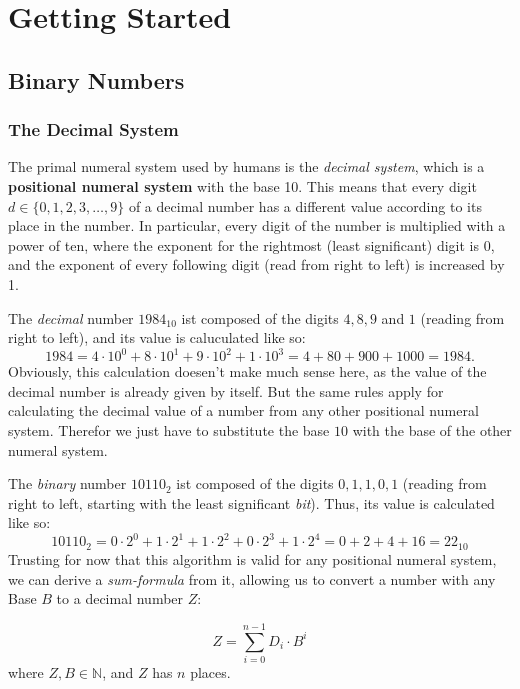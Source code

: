 \chapter{Getting Started}

\section{Binary Numbers}

\subsection{The Decimal System}

The primal numeral system used by humans is the \emph{decimal system}, which is a \textbf{positional numeral system} with the base 10.
This means that every digit $d \in \{0,1,2,3,\ldots,9\}$ of a decimal number has a different value according to its place in the number.
In particular, every digit of the number is multiplied with a power of ten, where the exponent for the rightmost (least significant) digit is 0, and the exponent of every following digit (read from right to left) is increased by 1.

The \emph{decimal} number $1984_{10}$ ist composed of the digits $4,8,9$ and $1$ (reading from right to left), and its value is caluculated like so:
\begin{equation*}
1984=4\cdot10^0+8\cdot10^1+9\cdot10^2+1\cdot10^3=4+80+900+1000=1984.
\end{equation*}
Obviously, this calculation doesen't make much sense here, as the value of the decimal number is already given by itself.
But the same rules apply for calculating the decimal value of a number from any other positional numeral system.
Therefor we just have to substitute the base $10$ with the base of the other numeral system.

The \emph{binary} number $10110_2$ ist composed of the digits $0,1,1,0,1$ (reading from right to left, starting with the least significant \emph{bit}). 
Thus, its value is calculated like so:
\begin{equation*}
10110_2=0\cdot2^0+1\cdot2^1+1\cdot2^2+0\cdot2^3+1\cdot2^4=0+2+4+16=22_{10}
\end{equation*}
Trusting for now that this algorithm is valid for any positional numeral system, we can derive a \emph{sum-formula} from it, allowing us to convert a number with any Base $B$ to a decimal number $Z$:

\begin{equation} \label{eq:sum}
\boxed{Z=\sum_{i=0}^{n-1} D_i \cdot B^i}
\end{equation}
where $Z,B \in \mathbb{N}$, and $Z$ has $n$ places.

